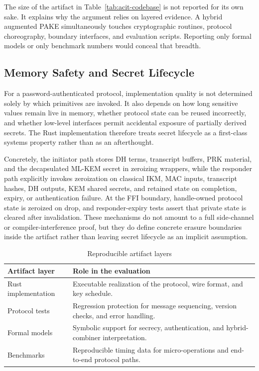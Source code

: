 \documentclass[conference]{IEEEtran}
\begin{document}
The size of the artifact in Table~\ref{tab:acit-codebase} is not reported for its own sake. It explains why the argument relies on layered evidence. A hybrid augmented PAKE simultaneously touches cryptographic routines, protocol choreography, boundary interfaces, and evaluation scripts. Reporting only formal models or only benchmark numbers would conceal that breadth.

\subsection{Memory Safety and Secret Lifecycle}

For a password-authenticated protocol, implementation quality is not determined solely by which primitives are invoked. It also depends on how long sensitive values remain live in memory, whether protocol state can be reused incorrectly, and whether low-level interfaces permit accidental exposure of partially derived secrets. The Rust implementation therefore treats secret lifecycle as a first-class systems property rather than as an afterthought.

Concretely, the initiator path stores DH terms, transcript buffers, PRK material, and the decapsulated ML-KEM secret in zeroizing wrappers, while the responder path explicitly invokes zeroization on classical IKM, MAC inputs, transcript hashes, DH outputs, KEM shared secrets, and retained state on completion, expiry, or authentication failure. At the FFI boundary, handle-owned protocol state is zeroized on drop, and responder-expiry tests assert that private state is cleared after invalidation. These mechanisms do not amount to a full side-channel or compiler-interference proof, but they do define concrete erasure boundaries inside the artifact rather than leaving secret lifecycle as an implicit assumption.

\begin{table}[t]
\caption{Reproducible artifact layers}
\label{tab:acit-artifacts}
\centering
\footnotesize
\begin{tabularx}{\columnwidth}{@{}L{2.2cm}Y@{}}
\toprule
Artifact layer & Role in the evaluation \\
\midrule
Rust implementation & Executable realization of the protocol, wire format, and key schedule. \\
Protocol tests & Regression protection for message sequencing, version checks, and error handling. \\
Formal models & Symbolic support for secrecy, authentication, and hybrid-combiner interpretation. \\
Benchmarks & Reproducible timing data for micro-operations and end-to-end protocol paths. \\
\bottomrule
\end{tabularx}
\end{table}
\end{document}
